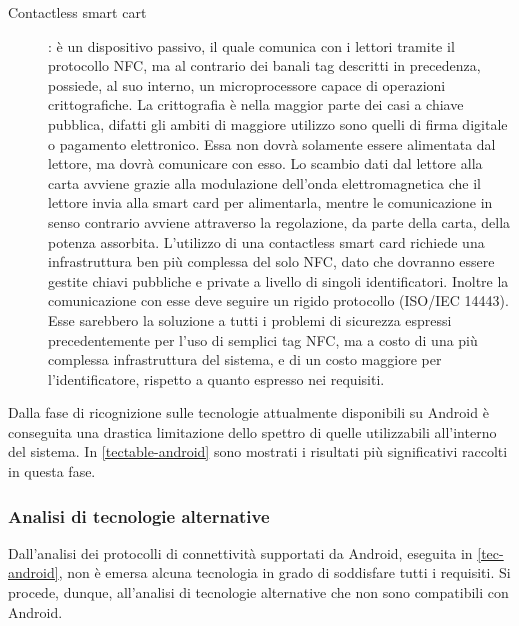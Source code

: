 \documentclass[a4paper,12pt]{report}
\begin{document}
\begin{description}
	\item[Contactless smart cart]: è un dispositivo passivo, il quale comunica con i lettori tramite il protocollo NFC, ma al contrario dei banali tag descritti in precedenza, possiede, al suo interno, un microprocessore capace di operazioni crittografiche. La crittografia è nella maggior parte dei casi a chiave pubblica, difatti gli ambiti di maggiore utilizzo sono quelli di firma digitale o pagamento elettronico. Essa non dovrà solamente essere alimentata dal lettore, ma dovrà comunicare con esso. Lo scambio dati dal lettore alla carta avviene grazie alla modulazione dell'onda elettromagnetica che il lettore invia alla smart card per alimentarla, mentre le comunicazione in senso contrario avviene attraverso la regolazione, da parte della carta, della potenza assorbita. L'utilizzo di una contactless smart card richiede una infrastruttura ben più complessa del solo NFC, dato che dovranno essere gestite chiavi pubbliche e private a livello di singoli identificatori. Inoltre la comunicazione con esse deve seguire un rigido protocollo (ISO/IEC 14443). Esse sarebbero la soluzione a tutti i problemi di sicurezza espressi precedentemente per l'uso di semplici tag NFC, ma a costo di una più complessa infrastruttura del sistema, e di un costo maggiore per l'identificatore, rispetto a quanto espresso nei requisiti. 
\end{description}

Dalla fase di ricognizione sulle tecnologie attualmente disponibili su Android è conseguita una drastica limitazione dello spettro di quelle utilizzabili all'interno del sistema. In \autoref{tectable-android} sono mostrati i risultati più significativi raccolti in questa fase.

\subsubsection{Analisi di tecnologie alternative} \label{tec-other}
Dall'analisi dei protocolli di connettività supportati da Android, eseguita in \autoref{tec-android}, non è emersa alcuna tecnologia in grado di soddisfare tutti i requisiti. Si procede, dunque, all'analisi di tecnologie alternative che non sono compatibili con Android.
\end{document}
